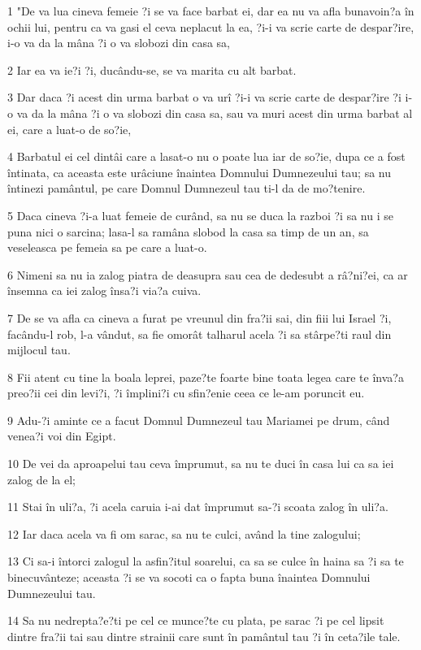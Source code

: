\par 1 "De va lua cineva femeie ?i se va face barbat ei, dar ea nu va afla bunavoin?a în ochii lui, pentru ca va gasi el ceva neplacut la ea, ?i-i va scrie carte de despar?ire, i-o va da la mâna ?i o va slobozi din casa sa,
\par 2 Iar ea va ie?i ?i, ducându-se, se va marita cu alt barbat.
\par 3 Dar daca ?i acest din urma barbat o va urî ?i-i va scrie carte de despar?ire ?i i-o va da la mâna ?i o va slobozi din casa sa, sau va muri acest din urma barbat al ei, care a luat-o de so?ie,
\par 4 Barbatul ei cel dintâi care a lasat-o nu o poate lua iar de so?ie, dupa ce a fost întinata, ca aceasta este urâciune înaintea Domnului Dumnezeului tau; sa nu întinezi pamântul, pe care Domnul Dumnezeul tau ti-l da de mo?tenire.
\par 5 Daca cineva ?i-a luat femeie de curând, sa nu se duca la razboi ?i sa nu i se puna nici o sarcina; lasa-l sa ramâna slobod la casa sa timp de un an, sa veseleasca pe femeia sa pe care a luat-o.
\par 6 Nimeni sa nu ia zalog piatra de deasupra sau cea de dedesubt a râ?ni?ei, ca ar însemna ca iei zalog însa?i via?a cuiva.
\par 7 De se va afla ca cineva a furat pe vreunul din fra?ii sai, din fiii lui Israel ?i, facându-l rob, l-a vândut, sa fie omorât talharul acela ?i sa stârpe?ti raul din mijlocul tau.
\par 8 Fii atent cu tine la boala leprei, paze?te foarte bine toata legea care te înva?a preo?ii cei din levi?i, ?i împlini?i cu sfin?enie ceea ce le-am poruncit eu.
\par 9 Adu-?i aminte ce a facut Domnul Dumnezeul tau Mariamei pe drum, când venea?i voi din Egipt.
\par 10 De vei da aproapelui tau ceva împrumut, sa nu te duci în casa lui ca sa iei zalog de la el;
\par 11 Stai în uli?a, ?i acela caruia i-ai dat împrumut sa-?i scoata zalog în uli?a.
\par 12 Iar daca acela va fi om sarac, sa nu te culci, având la tine zalogului;
\par 13 Ci sa-i întorci zalogul la asfin?itul soarelui, ca sa se culce în haina sa ?i sa te binecuvânteze; aceasta ?i se va socoti ca o fapta buna înaintea Domnului Dumnezeului tau.
\par 14 Sa nu nedrepta?e?ti pe cel ce munce?te cu plata, pe sarac ?i pe cel lipsit dintre fra?ii tai sau dintre strainii care sunt în pamântul tau ?i în ceta?ile tale.
